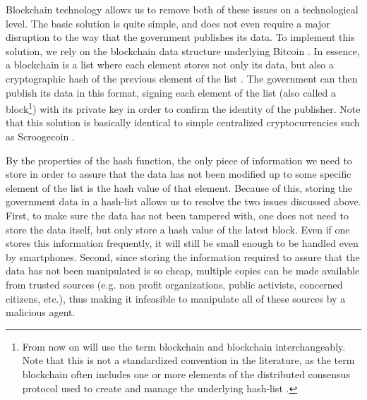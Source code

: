Blockchain technology allows us to remove both of these issues on a technological level. The basic solution is quite simple, and does not even require a major disruption to the way that the government publishes its data. To implement this solution, we rely on the blockchain data structure underlying Bitcoin \cite{whitepaper,bitcoinbook}. In essence, a blockchain is a list where each element stores not only its data, but also a cryptographic hash of the previous element of the list \cite{bitcoinbook}. The government can then publish its data in this format, signing each element of the list (also called a block\footnote{From now on will use the term blockchain and blockchain interchangeably. Note that this is not a standardized convention in the literature, as the term blockchain often includes one or more elements of the distributed consensus protocol used to create and manage the underlying hash-list \cite{NarayananC17}.}) with its private key in order to confirm the identity of the publisher. Note that this solution is basically identical to simple centralized cryptocurrencies such as Scroogecoin \cite{bitcoinbook}.

By the properties of the hash function, the only piece of information we need to store in order to assure that the data has not been modified up to some specific element of the list is the hash value of that element. Because of this, storing the government data in a hash-list allows us to resolve the two issues discussed above. First, to make sure the data has not been tampered with, one does not need to store the data itself, but only store a hash value of the latest block. Even if one stores this information frequently, it will still be small enough to be handled even by smartphones. Second, since storing the information required to assure that the data has not been manipulated is so cheap, multiple copies can be made available from trusted sources (e.g. non profit organizations, public activists, concerned citizens, etc.), thus making it infeasible to manipulate all of these sources by a malicious agent.






